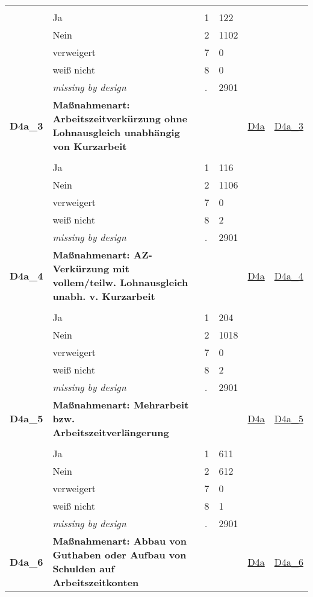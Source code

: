 \begin{longtable}{| L{2.45cm} | L{6cm} | C{1.5cm} | R{1cm} | C{2.25cm} | C{2.25cm} |}
   &  &  &  &  &  \\ 
   & Ja & 1 & 122 &  &  \\ 
   & Nein & 2 & 1102 &  &  \\ 
   & verweigert & 7 & 0 &  &  \\ 
   & weiß nicht & 8 & 0 &  &  \\ 
   & \textit{missing by design} & \textit{.} & 2901 &  &  \\ 
   \midrule
\textbf{D4a\_3}\label{var:D4a:3} & \textbf{Maßnahmenart: Arbeitszeitverkürzung ohne Lohnausgleich unabhängig von Kurzarbeit} &  &  & \hyperref[D4a]{D4a} & \hyperref[var:suf:D4a:3]{D4a\_3} \\ 
   &  &  &  &  &  \\ 
   & Ja & 1 & 116 &  &  \\ 
   & Nein & 2 & 1106 &  &  \\ 
   & verweigert & 7 & 0 &  &  \\ 
   & weiß nicht & 8 & 2 &  &  \\ 
   & \textit{missing by design} & \textit{.} & 2901 &  &  \\ 
   \midrule
\textbf{D4a\_4}\label{var:D4a:4} & \textbf{Maßnahmenart: AZ-Verkürzung mit vollem/teilw. Lohnausgleich unabh. v. Kurzarbeit} &  &  & \hyperref[D4a]{D4a} & \hyperref[var:suf:D4a:4]{D4a\_4} \\ 
   &  &  &  &  &  \\ 
   & Ja & 1 & 204 &  &  \\ 
   & Nein & 2 & 1018 &  &  \\ 
   & verweigert & 7 & 0 &  &  \\ 
   & weiß nicht & 8 & 2 &  &  \\ 
   & \textit{missing by design} & \textit{.} & 2901 &  &  \\ 
   \midrule
\textbf{D4a\_5}\label{var:D4a:5} & \textbf{Maßnahmenart: Mehrarbeit bzw. Arbeitszeitverlängerung} &  &  & \hyperref[D4a]{D4a} & \hyperref[var:suf:D4a:5]{D4a\_5} \\ 
   &  &  &  &  &  \\ 
   & Ja & 1 & 611 &  &  \\ 
   & Nein & 2 & 612 &  &  \\ 
   & verweigert & 7 & 0 &  &  \\ 
   & weiß nicht & 8 & 1 &  &  \\ 
   & \textit{missing by design} & \textit{.} & 2901 &  &  \\ 
   \midrule
\textbf{D4a\_6}\label{var:D4a:6} & \textbf{Maßnahmenart: Abbau von Guthaben oder Aufbau von Schulden auf Arbeitszeitkonten} &  &  & \hyperref[D4a]{D4a} & \hyperref[var:suf:D4a:6]{D4a\_6} \\ 

\end{longtable}
